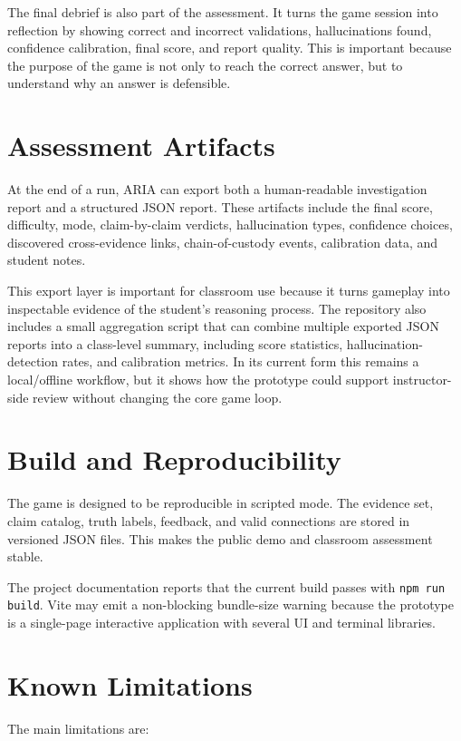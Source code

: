 The final debrief is also part of the assessment. It turns the game session into reflection by showing correct and incorrect validations, hallucinations found, confidence calibration, final score, and report quality. This is important because the purpose of the game is not only to reach the correct answer, but to understand why an answer is defensible.

\section{Assessment Artifacts}

At the end of a run, ARIA can export both a human-readable investigation report and a structured JSON report. These artifacts include the final score, difficulty, mode, claim-by-claim verdicts, hallucination types, confidence choices, discovered cross-evidence links, chain-of-custody events, calibration data, and student notes.

This export layer is important for classroom use because it turns gameplay into inspectable evidence of the student's reasoning process. The repository also includes a small aggregation script that can combine multiple exported JSON reports into a class-level summary, including score statistics, hallucination-detection rates, and calibration metrics. In its current form this remains a local/offline workflow, but it shows how the prototype could support instructor-side review without changing the core game loop.

\section{Build and Reproducibility}

The game is designed to be reproducible in scripted mode. The evidence set, claim catalog, truth labels, feedback, and valid connections are stored in versioned JSON files. This makes the public demo and classroom assessment stable.

The project documentation reports that the current build passes with \texttt{npm run build}. Vite may emit a non-blocking bundle-size warning because the prototype is a single-page interactive application with several UI and terminal libraries.

\section{Known Limitations}

The main limitations are:

